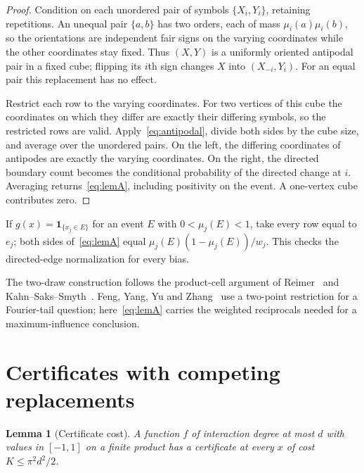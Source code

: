 \documentclass[11pt]{article}
\numberwithin{equation}{section}
\theoremstyle{plain}
\newtheorem{lem}{Lemma}
\theoremstyle{remark}
\begin{document}
\begin{proof}
Condition on each unordered pair of symbols $\{X_i,Y_i\}$, retaining repetitions. An unequal pair $\{a,b\}$ has two orders, each of mass $\mu_i(a)\mu_i(b)$, so the orientations are independent fair signs on the varying coordinates while the other coordinates stay fixed. Thus $(X,Y)$ is a uniformly oriented antipodal pair in a fixed cube; flipping its $i$th sign changes $X$ into $(X_{-i},Y_i)$. For an equal pair this replacement has no effect.

Restrict each row to the varying coordinates. For two vertices of this cube the coordinates on which they differ are exactly their differing symbols, so the restricted rows are valid. Apply~\eqref{eq:antipodal}, divide both sides by the cube size, and average over the unordered pairs. On the left, the differing coordinates of antipodes are exactly the varying coordinates. On the right, the directed boundary count becomes the conditional probability of the directed change at $i$. Averaging returns~\eqref{eq:lemA}, including positivity on the event. A one-vertex cube contributes zero.
\end{proof}

If $g(x)=\mathbf1_{\{x_j\in E\}}$ for an event $E$ with $0<\mu_j(E)<1$, take every row equal to $e_j$; both sides of~\eqref{eq:lemA} equal $\mu_j(E)(1-\mu_j(E))/w_j$. This checks the directed-edge normalization for every bias.

The two-draw construction follows the product-cell argument of Reimer~\cite{Rei00} and Kahn--Saks--Smyth~\cite{KSS11}. Feng, Yang, Yu and Zhang~\cite{FYYZ26} use a two-point restriction for a Fourier-tail question; here~\eqref{eq:lemA} carries the weighted reciprocals needed for a maximum-influence conclusion.

\section{Certificates with competing replacements}\label{sec:certs}
\begin{lem}[Certificate cost]\label{lem:B}
A function $f$ of interaction degree at most $d$ with values in $[-1,1]$ on a finite product has a certificate at every $x$ of cost $K\le\pi^2d^2/2$.
\end{lem}
\end{document}
